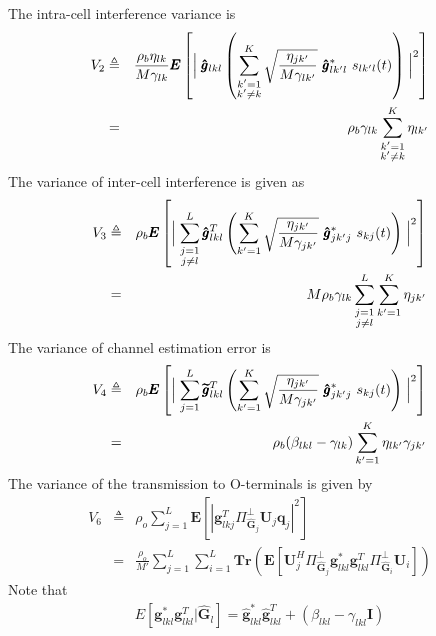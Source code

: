 \documentclass[10pt, a4paper, twoside,fleqn]{article}
\begin{document}
The intra-cell interference variance is
\begin{eqnarray}\label{eq:noiseF2}
	V_2 &\triangleq& \frac{\rho_b\eta_{lk}}{M\gamma_{lk}} \pmb{E}\left[\Bigm| \pmb{\hat g}_{lkl}  \left(\sum_{\substack{k'=1 \\ k' \neq k}}^{K} \sqrt{\frac{\eta_{jk'}}{M\gamma_{lk'}}} \ \pmb{\hat g}^*_{lk'l} \ s_{lk'l} (t)\right)\Bigm|^2\right] \nonumber \\
	    &=&  \rho_b\gamma_{lk}\sum\limits_{\substack{k'=1\\ k'\neq k}}^{K}\eta_{lk'}
\end{eqnarray}
The variance of inter-cell interference is given as
\begin{eqnarray}\label{eq:noiseF3}
	V_3 &\triangleq& \rho_b \pmb{E}\left[\Bigm|\sum_{\substack{j=1 \\ j \neq l}}^{L} \pmb{\hat g}_{lkl}^T \left(\sum_{k'=1}^{K} \sqrt{\frac{\eta_{jk'}}{M\gamma_{jk'}}} \ \pmb{\hat g}^*_{jk'j} \ s_{kj} (t)\right)\Bigm|^2\right] \nonumber \\
       &=& M\rho_b\gamma_{lk}\sum_{\substack{j=1 \\ j \neq l}}^{L}\sum_{k'=1}^{K}\eta_{jk'}
\end{eqnarray}
The variance of channel estimation error is
\begin{eqnarray}\label{eqn:noiseF4}
	V_4 &\triangleq& \rho_b \pmb{E} \left[ \Bigm |\sum_{j=1}^{L} \pmb{\widetilde{g}}_{lkl}^T \left(\sum_{k'=1}^{K} \sqrt{\frac{\eta_{jk'}}{M\gamma_{jk'}}} \ \pmb{\hat g}^*_{jk'j} \ s_{kj} (t)\right)\Bigm|^2 \right] \nonumber \\
        &=& \rho_b(\beta_{lkl}-\gamma_{lk})\sum\limits_{k'=1}^{K}\eta_{lk'}\gamma_{jk'}
\end{eqnarray}
The variance of the transmission to O-terminals is given by
\begin{eqnarray}\label{eqn:noiseF4_1}
	V_6 &\triangleq& \rho_o\sum_{j=1}^{L}\pmb{E}\left[|\pmb{g}_{lkj}^T\Pi^{\perp}_{{\widehat{\pmb{G}}_j}}\pmb{U}_j \pmb{q}_{j}|^2\right] \\
            &=&       \frac{\rho_o}{M'}\sum_{j=1}^{L}\sum_{i=1}^{L} \pmb{Tr}\left(\pmb{E}\left[\pmb{U}_j^H \Pi^{\perp}_{\pmb{\widehat{G}}_j} \pmb{g}_{lkl}^* \pmb{g}_{lkl}^{T}\Pi^{\perp}_{\pmb{\hat G}_i} \pmb{U}_i \right]\right)
\end{eqnarray}
Note that 
\begin{eqnarray}\label{eqn:conditionghat}
    E[\pmb{g}_{lkl}^*\pmb{g}_{lkl}^T|\pmb{\hat G}_l] = \pmb{\hat g}_{lkl}^*\pmb{\hat g}_{lkl}^T + (\beta_{lkl}-\gamma_{lkl}\pmb{I})
\end{eqnarray} 
\end{document}
